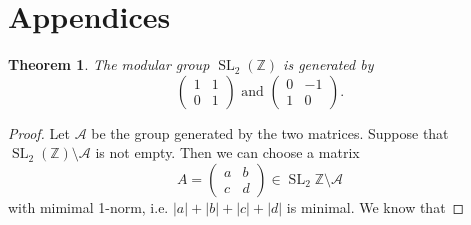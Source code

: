 \documentclass[a4paper]{article}
\theoremstyle{theoremdd}
\newtheorem{theorem}{Theorem}[section]
\theoremstyle{definitiondd}
\theoremstyle{remarkdd}
\newcommand{\Z}{\mathbb{Z}}
\DeclareMathOperator{\SL}{SL}
\begin{document}
\section{Appendices}
\begin{theorem}
	The modular group $\SL_2(\Z)$ is generated by \[ 	
	\begin{pmatrix}  1 & 1 \\ 0 & 1 \end{pmatrix} 
	\text{ and }
	\begin{pmatrix} 0 & -1 \\ 1 & 0 \end{pmatrix} 
.\] 

\end{theorem}
\begin{proof}
	Let $\mathcal{A} $ be the group generated by the two matrices. 
	Suppose that $\SL_2(\Z) \setminus \mathcal{A} $ is not empty.
	Then we can choose a matrix \[
		A =\begin{pmatrix} a & b \\ c& d\end{pmatrix} \in \SL_2\Z \setminus \mathcal{A} 
	\] 
	with mimimal 1-norm, i.e. $|a| + |b| + |c| + |d|$ is minimal.
	We know that 
\end{proof}
\end{document}
